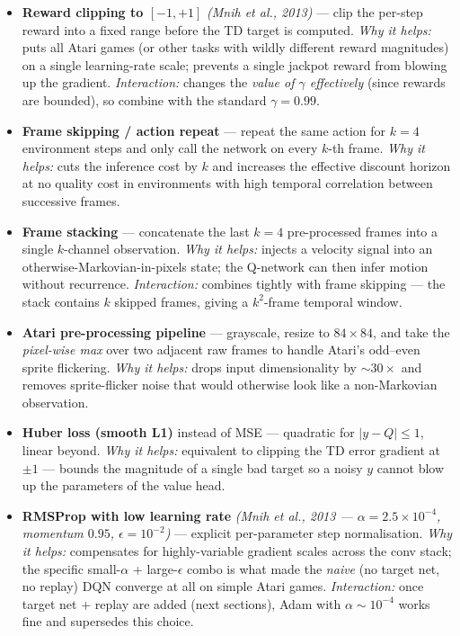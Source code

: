 \documentclass[11pt]{article}
\begin{document}
\begin{itemize}
\item
  \label{trick-3-1-1}\textbf{Reward clipping to
  \([-1, +1]\)} \emph{(Mnih et al., 2013)} --- clip the per-step reward
  into a fixed range before the TD target is computed. \emph{Why it
  helps:} puts all Atari games (or other tasks with wildly different
  reward magnitudes) on a single learning-rate scale; prevents a single
  jackpot reward from blowing up the gradient. \emph{Interaction:}
  changes the \emph{value of \(\gamma\) effectively} (since rewards are
  bounded), so combine with the standard \(\gamma=0.99\).
\item
  \label{trick-3-1-2}\textbf{Frame skipping / action
  repeat} --- repeat the same action for \(k=4\) environment steps and
  only call the network on every \(k\)-th frame. \emph{Why it helps:}
  cuts the inference cost by \(k\) and increases the effective discount
  horizon at no quality cost in environments with high temporal
  correlation between successive frames.
\item
  \label{trick-3-1-3}\textbf{Frame stacking} ---
  concatenate the last \(k=4\) pre-processed frames into a single
  \(k\)-channel observation. \emph{Why it helps:} injects a velocity
  signal into an otherwise-Markovian-in-pixels state; the Q-network can
  then infer motion without recurrence. \emph{Interaction:} combines
  tightly with frame skipping --- the stack contains \(k\) skipped
  frames, giving a \(k^2\)-frame temporal window.
\item
  \label{trick-3-1-4}\textbf{Atari pre-processing
  pipeline} --- grayscale, resize to \(84\times 84\), and take the
  \emph{pixel-wise max} over two adjacent raw frames to handle Atari's
  odd--even sprite flickering. \emph{Why it helps:} drops input
  dimensionality by \(\sim 30\times\) and removes sprite-flicker noise
  that would otherwise look like a non-Markovian observation.
\item
  \label{trick-3-1-5}\textbf{Huber loss (smooth L1)}
  instead of MSE --- quadratic for \(|y - Q|\le 1\), linear beyond.
  \emph{Why it helps:} equivalent to clipping the TD error gradient at
  \(\pm 1\) --- bounds the magnitude of a single bad target so a noisy
  \(y\) cannot blow up the parameters of the value head.
\item
  \label{trick-3-1-6}\textbf{RMSProp with low learning
  rate} \emph{(Mnih et al., 2013 --- \(\alpha=2.5\!\times\!10^{-4}\),
  momentum \(0.95\), \(\epsilon=10^{-2}\))} --- explicit per-parameter
  step normalisation. \emph{Why it helps:} compensates for
  highly-variable gradient scales across the conv stack; the specific
  small-\(\alpha\) + large-\(\epsilon\) combo is what made the
  \emph{naive} (no target net, no replay) DQN converge at all on simple
  Atari games. \emph{Interaction:} once target net + replay are added
  (next sections), Adam with \(\alpha\!\sim\!10^{-4}\) works fine and
  supersedes this choice.
\end{itemize}
\end{document}
